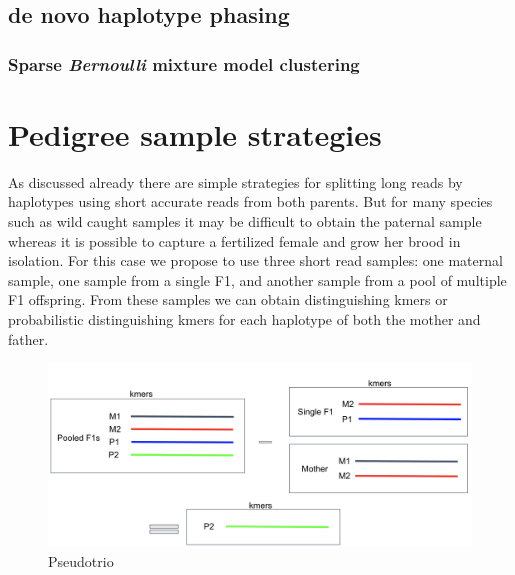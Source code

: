 \subsection{de novo haplotype phasing}

\subsubsection{Sparse \textit{Bernoulli} mixture model clustering}


\cite{HICphasing} %





\section{Pedigree sample strategies}
As discussed already there are simple strategies for splitting long reads by haplotypes using short accurate reads from both parents. 
But for many species such as wild caught samples it may be difficult to obtain the paternal sample whereas it is possible to capture a 
fertilized female and grow her brood in isolation. For this case we propose to use three short read samples: one maternal sample, one sample 
from a single F1, and another sample from a pool of multiple F1 offspring. From these samples we can obtain distinguishing kmers or probabilistic 
distinguishing kmers for each haplotype of both the mother and father.

\begin{figure}[h!]
\caption{Pseudotrio}
\label{figure:pseudotrio}
\begin{centering}
\includegraphics[width=\textwidth]{pseudotrio.png}
\end{centering}
\end{figure}

